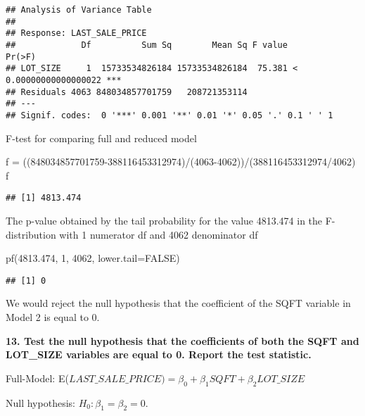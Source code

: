\documentclass[
]{article}
\newenvironment{Shaded}{\begin{snugshade}}{\end{snugshade}}
\newcommand{\AttributeTok}[1]{\textcolor[rgb]{0.77,0.63,0.00}{#1}}
\newcommand{\ConstantTok}[1]{\textcolor[rgb]{0.00,0.00,0.00}{#1}}
\newcommand{\DecValTok}[1]{\textcolor[rgb]{0.00,0.00,0.81}{#1}}
\newcommand{\FloatTok}[1]{\textcolor[rgb]{0.00,0.00,0.81}{#1}}
\newcommand{\FunctionTok}[1]{\textcolor[rgb]{0.00,0.00,0.00}{#1}}
\newcommand{\NormalTok}[1]{#1}
\newcommand{\OtherTok}[1]{\textcolor[rgb]{0.56,0.35,0.01}{#1}}
\newcommand{\SpecialCharTok}[1]{\textcolor[rgb]{0.00,0.00,0.00}{#1}}
\begin{document}
\begin{verbatim}
## Analysis of Variance Table
## 
## Response: LAST_SALE_PRICE
##             Df          Sum Sq        Mean Sq F value                Pr(>F)    
## LOT_SIZE     1  15733534826184 15733534826184  75.381 < 0.00000000000000022 ***
## Residuals 4063 848034857701759   208721353114                                  
## ---
## Signif. codes:  0 '***' 0.001 '**' 0.01 '*' 0.05 '.' 0.1 ' ' 1
\end{verbatim}

F-test for comparing full and reduced model

\begin{Shaded}
\begin{Highlighting}[]
\NormalTok{f }\OtherTok{=}\NormalTok{ ((}\DecValTok{848034857701759{-}388116453312974}\NormalTok{)}\SpecialCharTok{/}\NormalTok{(}\DecValTok{4063{-}4062}\NormalTok{))}\SpecialCharTok{/}\NormalTok{(}\DecValTok{388116453312974}\SpecialCharTok{/}\DecValTok{4062}\NormalTok{)}
\NormalTok{f}
\end{Highlighting}
\end{Shaded}

\begin{verbatim}
## [1] 4813.474
\end{verbatim}

The p-value obtained by the tail probability for the value 4813.474 in
the F-distribution with 1 numerator df and 4062 denominator df

\begin{Shaded}
\begin{Highlighting}[]
\FunctionTok{pf}\NormalTok{(}\FloatTok{4813.474}\NormalTok{, }\DecValTok{1}\NormalTok{, }\DecValTok{4062}\NormalTok{, }\AttributeTok{lower.tail=}\ConstantTok{FALSE}\NormalTok{)}
\end{Highlighting}
\end{Shaded}

\begin{verbatim}
## [1] 0
\end{verbatim}

We would reject the null hypothesis that the coefficient of the SQFT
variable in Model 2 is equal to 0.

\textbf{13. Test the null hypothesis that the coefficients of both the
SQFT and LOT\_SIZE variables are equal to 0. Report the test statistic.}

Full-Model:
E(\(LAST\_SALE\_PRICE)=\beta_0 + \beta_1 SQFT + \beta_2 LOT\_SIZE\)

Null hypothesis: \(H_0:\beta_1 = \beta_2 =0\).
\end{document}
